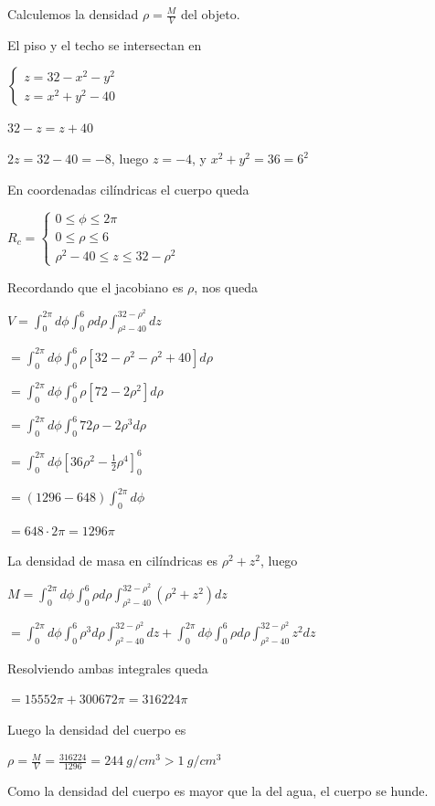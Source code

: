 Calculemos la densidad $\rho = \frac{M}{V}$ del objeto.

El piso y el techo se intersectan en

$ \begin{cases} z = 32 - x^2 - y^2 \\ z = x^2 + y^2 - 40 \end{cases}$

$32-z = z + 40$

$2z = 32-40 = -8$, luego $z = -4$, y $x^2 + y^2 = 36 = 6^2 $

En coordenadas cilíndricas el cuerpo queda

$R_c = \begin{cases} 0 \leq \phi \leq 2 \pi \\ 0 \leq \rho \leq 6 \\ \rho^2 - 40 \leq z \leq 32 - \rho^2 \end{cases}$

Recordando que el jacobiano es $\rho$, nos queda

$V = \int_0^{2\pi} d\phi \int_0^6 \rho d\rho \int_{\rho^2 - 40}^{32-\rho^2} dz $

$ = \int_0^{2\pi} d\phi \int_0^6 \rho [32 - \rho^2 - \rho^2 + 40] d\rho $

$ = \int_0^{2\pi} d\phi \int_0^6 \rho [72 - 2\rho^2] d\rho $

$ = \int_0^{2\pi} d\phi \int_0^6 72\rho - 2\rho^3 d\rho $

$ = \int_0^{2\pi} d\phi [36 \rho^2 - \frac{1}{2} \rho^4]_0^6 $

$ = (1296-648) \int_0^{2\pi} d\phi $

$ = 648 \cdot 2 \pi = \boxed{1296 \pi}$

La densidad de masa en cilíndricas es $\rho^2 + z^2$, luego

$M = \int_0^{2\pi} d\phi \int_0^6 \rho d\rho \int_{\rho^2 - 40}^{32-\rho^2} (\rho^2 + z^2) dz $

$ = \int_0^{2\pi} d\phi \int_0^6 \rho^3 d\rho \int_{\rho^2 - 40}^{32-\rho^2} dz + \int_0^{2\pi} d\phi \int_0^6 \rho d\rho \int_{\rho^2 - 40}^{32-\rho^2} z^2 dz $

Resolviendo ambas integrales queda

$ = 15552 \pi + 300672 \pi = \boxed{316224 \pi}$

Luego la densidad del cuerpo es

$\rho = \frac{M}{V} = \frac{316224}{1296} = 244 \ g/cm^3 > 1 \ g/cm^3$

Como la densidad del cuerpo es mayor que la del agua, el cuerpo se hunde.


